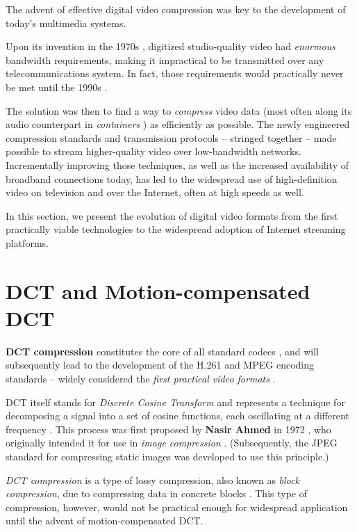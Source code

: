 The advent of effective digital video compression was key to the development of today’s multimedia systems.

Upon its invention in the 1970s \cite{ghanbari_2003}, digitized studio-quality video had \emph{enormous} bandwidth requirements, making it impractical to be transmitted over any telecommunications system.
In fact, those requirements would practically never be met until the 1990s \cite{wiki:Video_coding_format}.

The solution was then to find a way to \emph{compress} video data (most often along its audio counterpart in \emph{containers} \cite{wiki:Digital_container_format}) as efficiently as possible.
The newly engineered compression standards and transmission protocols -- stringed together -- made possible to stream higher-quality video over low-bandwidth networks.
Incrementally improving those techniques, as well as the increased availability of broadband connections today, has led to the widespread use of high-definition video on television and over the Internet, often at high speeds as well.

In this section, we present the evolution of digital video formats from the first practically viable technologies to the widespread adoption of Internet streaming platforms.

\section{DCT and Motion-compensated DCT}
\textbf{DCT compression} constitutes the core of all standard codecs \cite{ghanbari_2003}, and will subsequently lead to the development of the H.261 and MPEG encoding standards -- widely considered the \emph{first practical video formats} \cite{wiki:Timeline_of_online_video}.

DCT itself stands for \emph{Discrete Cosine Transform} and represents a technique for decomposing a signal into a set of cosine functions, each oscillating at a different frequency \cite{wiki:Discrete_cosine_transform}.
This process was first proposed by \textbf{Nasir Ahmed} in 1972 \cite{wiki:Discrete_cosine_transform}, who originally intended it for use in \emph{image compression} \cite{wiki:Video_coding_format}.
(Subsequently, the JPEG standard for compressing static images was developed to use this principle.)

\emph{DCT compression} is a type of lossy compression, also known as \emph{block compression}, due to compressing data in concrete blocks \cite{wiki:Discrete_cosine_transform}.
This type of compression, however, would not be practical enough for widespread application until the advent of motion-compensated DCT.

